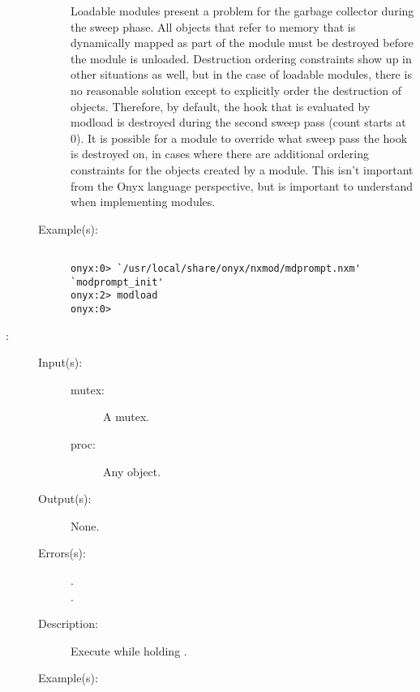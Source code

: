 \begin{description}
\begin{description}
		Loadable modules present a problem for the garbage collector
		during the sweep phase.  All objects that refer to memory that
		is dynamically mapped as part of the module must be destroyed
		before the module is unloaded.  Destruction ordering constraints
		show up in other situations as well, but in the case of loadable
		modules, there is no reasonable solution except to explicitly
		order the destruction of objects.  Therefore, by default, the
		hook that is evaluated by modload is destroyed during the second
		sweep pass (count starts at 0).  It is possible for a module to
		override what sweep pass the hook is destroyed on, in cases
		where there are additional ordering constraints for the objects
		created by a module.  This isn't important from the Onyx
		language perspective, but is important to understand when
		implementing modules.
	\item[Example(s): ]\begin{verbatim}

onyx:0> `/usr/local/share/onyx/nxmod/mdprompt.nxm' `modprompt_init'
onyx:2> modload
onyx:0>
	\end{verbatim}
	\end{description}
\label{systemdict:monitor}
\item[{\onyxop{mutex proc}{monitor}{--}}: ]
	\begin{description}\item[]
	\item[Input(s): ]
		\begin{description}\item[]
		\item[mutex: ]
			A mutex.
		\item[proc: ]
			Any object.
		\end{description}
	\item[Output(s): ] None.
	\item[Errors(s): ]
		\begin{description}\item[]
		\item[.]
		\item[.]
		\end{description}
	\item[Description: ]
		Execute  while holding .
	\item[Example(s): ]\begin{verbatim}


\end{verbatim}
\end{description}
\end{description}
